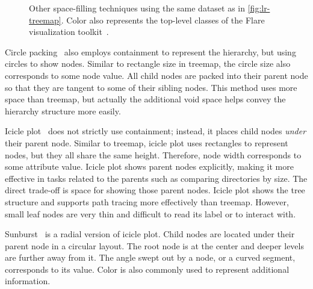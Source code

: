 \begin{figure}[!htb]
	\centering
	\hfill
	
	\vspace{.5\baselineskip}
	
	\caption{Other space-filling techniques using the same dataset as in \autoref{fig:lr-treemap}. Color also represents the top-level classes of the Flare visualization toolkit~\cite{Heer2009b}.}
	\label{fig:lr-other-space-filling}
\end{figure}

Circle packing~\cite{Wang2006} also employs containment to represent the hierarchy, but using circles to show nodes. Similar to rectangle size in treemap, the circle size also corresponds to some node value. All child nodes are packed into their parent node so that they are tangent to some of their sibling nodes. This method uses more space than treemap, but actually the additional void space helps convey the hierarchy structure more easily.

Icicle plot~\cite{Kruskal1983} does not strictly use containment; instead, it places child nodes \emph{under} their parent node. Similar to treemap, icicle plot uses rectangles to represent nodes, but they all share the same height. Therefore, node width corresponds to some attribute value. Icicle plot shows parent nodes explicitly, making it more effective in tasks related to the parents such as comparing directories by size. The direct trade-off is space for showing those parent nodes. Icicle plot shows the tree structure and supports path tracing more effectively than treemap. However, small leaf nodes are very thin and difficult to read its label or to interact with.

Sunburst~\cite{Zhang2000} is a radial version of icicle plot. Child nodes are located under their parent node in a circular layout. The root node is at the center and deeper levels are further away from it. The angle swept out by a node, or a curved segment, corresponds to its value. Color is also commonly used to represent additional information.

